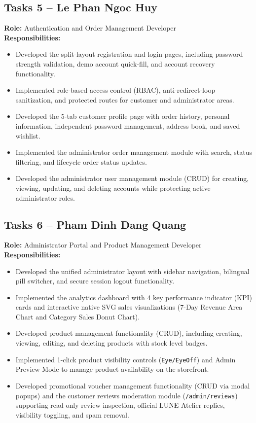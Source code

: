 \documentclass[12pt,a4paper,oneside]{report}
\begin{document}
\subsection{Tasks 5 -- Le Phan Ngoc Huy}
\textbf{Role:} Authentication and Order Management Developer\\
\textbf{Responsibilities:}
\begin{itemize}[leftmargin=1.2cm]
    \item Developed the split-layout registration and login pages, including password strength validation, demo account quick-fill, and account recovery functionality.
    \item Implemented role-based access control (RBAC), anti-redirect-loop sanitization, and protected routes for customer and administrator areas.
    \item Developed the 5-tab customer profile page with order history, personal information, independent password management, address book, and saved wishlist.
    \item Implemented the administrator order management module with search, status filtering, and lifecycle order status updates.
    \item Developed the administrator user management module (CRUD) for creating, viewing, updating, and deleting accounts while protecting active administrator roles.
\end{itemize}

\subsection{Tasks 6 -- Pham Dinh Dang Quang}
\textbf{Role:} Administrator Portal and Product Management Developer\\
\textbf{Responsibilities:}
\begin{itemize}[leftmargin=1.2cm]
    \item Developed the unified administrator layout with sidebar navigation, bilingual pill switcher, and secure session logout functionality.
    \item Implemented the analytics dashboard with 4 key performance indicator (KPI) cards and interactive native SVG sales visualizations (7-Day Revenue Area Chart and Category Sales Donut Chart).
    \item Developed product management functionality (CRUD), including creating, viewing, editing, and deleting products with stock level badges.
    \item Implemented 1-click product visibility controls (\texttt{Eye/EyeOff}) and Admin Preview Mode to manage product availability on the storefront.
    \item Developed promotional voucher management functionality (CRUD via modal popups) and the customer reviews moderation module (\texttt{/admin/reviews}) supporting read-only review inspection, official LUNE Atelier replies, visibility toggling, and spam removal.
\end{itemize}
\end{document}
